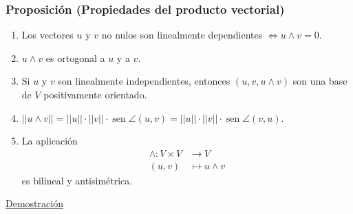 \documentclass[12pt, a4paper, ones, notitlepage, openany,titlepage]{article}
\newcommand{\demostracion}{\noindent\underline{Demostración}}
\begin{document}
\subsubsection{Proposición (Propiedades del producto vectorial)}
\begin{enumerate}
	\item Los vectores $u$ y $v$ no nulos son linealmente dependientes $\Longleftrightarrow u \wedge v = 0$.
	\item $u \wedge v$ es ortogonal a $u$ y a $v$.
	\item Si $u$ y $v$ son linealmente independientes, entonces $(u,v,u \wedge v)$ son una base de $V$ positivamente orientado.
	\item $||u \wedge v || = ||u|| \cdot ||v|| \cdot \operatorname{sen} \angle (u,v) = ||u|| \cdot ||v|| \cdot \operatorname{sen} \angle (v,u)$.
	\item La aplicación
	\begin{align*}
		\wedge : V \times V & \longrightarrow V \\
		(u,v) & \longmapsto u \wedge v
	\end{align*}
	es bilineal y antisimétrica.
\end{enumerate}
\demostracion\\
\end{document}
